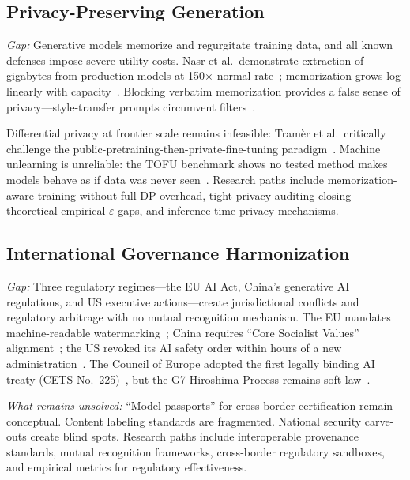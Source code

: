 \subsection{Privacy-Preserving Generation}
\label{sec:future-privacy}

\emph{Gap:} Generative models memorize and regurgitate training data, and all known defenses impose severe utility costs. Nasr et al.\ demonstrate extraction of gigabytes from production models at 150$\times$ normal rate~\cite{nasr2025extraction}; memorization grows log-linearly with capacity~\cite{carlini2023quantifying}. Blocking verbatim memorization provides a false sense of privacy---style-transfer prompts circumvent filters~\cite{ippolito2023verbatim}.

Differential privacy at frontier scale remains infeasible: Tram\`er et al.\ critically challenge the public-pretraining-then-private-fine-tuning paradigm~\cite{tramer2024dpposition}. Machine unlearning is unreliable: the TOFU benchmark shows no tested method makes models behave as if data was never seen~\cite{maini2024tofu}. Research paths include memorization-aware training without full DP overhead, tight privacy auditing closing theoretical-empirical $\varepsilon$ gaps, and inference-time privacy mechanisms.


\subsection{International Governance Harmonization}
\label{sec:future-governance}

\emph{Gap:} Three regulatory regimes---the EU AI Act, China's generative AI regulations, and US executive actions---create jurisdictional conflicts and regulatory arbitrage with no mutual recognition mechanism. The EU mandates machine-readable watermarking~\cite{euaiact2024}; China requires ``Core Socialist Values'' alignment~\cite{chinainterim2023}; the US revoked its AI safety order within hours of a new administration~\cite{eo14179}. The Council of Europe adopted the first legally binding AI treaty (CETS No.~225)~\cite{coe2024treaty}, but the G7 Hiroshima Process remains soft law~\cite{hiroshima2023}.

\emph{What remains unsolved:} ``Model passports'' for cross-border certification remain conceptual. Content labeling standards are fragmented. National security carve-outs create blind spots. Research paths include interoperable provenance standards, mutual recognition frameworks, cross-border regulatory sandboxes, and empirical metrics for regulatory effectiveness.



